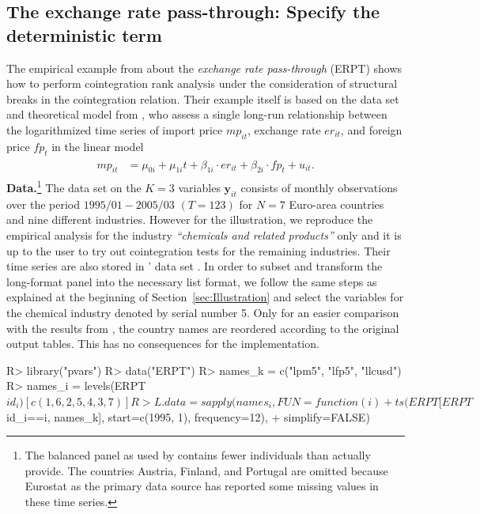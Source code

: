 \subsection{The exchange rate pass-through: Specify the deterministic term} \label{sec:ERPT}
The empirical example from \citet[Ch.~6]{ArsovaOersal2016} about the \textit{exchange rate pass-through} (ERPT) shows how to perform cointegration rank analysis under the consideration of structural breaks in the cointegration relation. Their example itself is based on the data set and theoretical model from \citet{BanerjeeSilvestre2015}, who assess a single long-run relationship between the logarithmized time series of import price $ m\!p_{it} $, exchange rate $ e\!r_{it} $, and foreign price $ f\!p_{t} $ in the linear model 
\begin{align} \label{eq:ERPT}
\begin{split}
	m\!p_{it} & = \mu_{0i} + \mu_{1i} t + \beta_{1i} \cdot e\!r_{it} + \beta_{2i} \cdot f\!p_{t} + u_{it}.
\end{split}
\end{align}
\textbf{Data.}\footnote{The balanced panel  as used by \citet{ArsovaOersal2016} contains fewer individuals than \citet{BanerjeeSilvestre2015} actually provide. The countries Austria, Finland, and Portugal are omitted because Eurostat as the primary data source has reported some missing values in these time series.} The data set on the $ K=3 $ variables $ \boldsymbol{y}_{it} $ consists of monthly observations over the period $1995/01 - 2005/03$ $(T=123)$ for $ N=7 $ Euro-area countries and nine different industries. However for the illustration, we reproduce the empirical analysis for the industry \textit{``chemicals and related products''} only and it is up to the user to try out cointegration tests for the remaining industries. Their time series are also stored in ' data set . In order to subset and transform the long-format panel  into the necessary list format, we follow the same steps as explained at the beginning of Section~\ref{sec:Illustration} and select the variables for the chemical industry denoted by serial number 5. Only for an easier comparison with the results from \citet{ArsovaOersal2016}, the country names  are reordered according to the original output tables. This has no consequences for the implementation.
\begin{CodeChunk}
\begin{CodeInput}
R> library("pvars")
R> data("ERPT")
R> names_k = c("lpm5", "lfp5", "llcusd")
R> names_i = levels(ERPT$id_i)[c(1,6,2,5,4,3,7)]
R> L.data  = sapply(names_i, FUN=function(i) 
+     ts(ERPT[ERPT$id_i==i, names_k], start=c(1995, 1), frequency=12), 
+     simplify=FALSE)
\end{CodeInput}
\end{CodeChunk}
